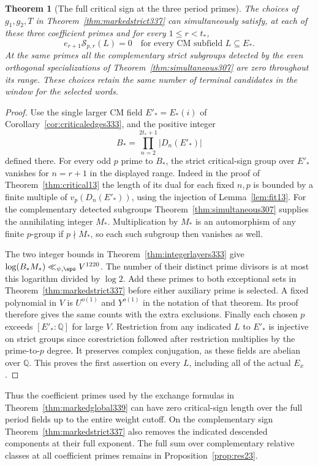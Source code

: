 \documentclass[a4paper,11pt]{article}
\newtheorem{theorem}[proposition]{Theorem}
\theoremstyle{definition}
\theoremstyle{remark}
\numberwithin{equation}{section}
\newcommand{\Sel}{\mathcal S}
\begin{document}
\begin{theorem}[The full critical sign at the three period primes]\label{thm:criticalmarks339}
The choices of \(g_1,g_2,T\) in Theorem~\ref{thm:markedstrict337}
can simultaneously satisfy, at each of these three coefficient
primes and for every \(1\le r<t_*\),
\[
                 e_{r+1}\Sel_{p,r}(L)=0
       \quad\text{for every CM subfield }L\subseteq E_* .
\]
At the same primes all the complementary strict subgroups detected
by the even orthogonal specializations of
Theorem~\ref{thm:simultaneous307} are zero throughout its range.
These choices retain the same number of terminal candidates in
the window for the selected words.
\end{theorem}
\begin{proof}
Use the single larger CM field \(E'_* = E_*(i)\) of
Corollary~\ref{cor:criticaledges333}, and the positive integer
\[
  B_*=\prod_{n=2}^{2t_*+1}|D_n(E'_*)|
\]
defined there. For every odd \(p\) prime to \(B_*\), the strict
critical-sign group over \(E'_*\) vanishes for \(n=r+1\) in the
displayed range. Indeed in the proof of Theorem~\ref{thm:critical13}
the length of its dual for each fixed \(n,p\) is bounded by
a finite multiple of \(v_p(D_n(E'_*))\), using the injection of
Lemma~\ref{lem:fit13}. For the complementary detected subgroups
Theorem~\ref{thm:simultaneous307} supplies the annihilating
integer \(M_*\). Multiplication by \(M_*\) is an automorphism of
any finite \(p\)-group if \(p\nmid M_*\), so each such subgroup
then vanishes as well.

The two integer bounds in Theorem~\ref{thm:integerlayers333}
give \(\log(B_*M_*)\ll_{\psi,\eps}V^{1220}\). The number of their
distinct prime divisors is at most this logarithm divided by
\(\log2\). Add these primes to both exceptional sets in
Theorem~\ref{thm:markedstrict337} before either auxiliary prime
is selected. A fixed polynomial in \(V\) is \(U^{o(1)}\) and
\(Y^{o(1)}\) in the notation of that theorem. Its proof therefore
gives the same counts with the extra exclusions.
Finally each chosen \(p\) exceeds \([E'_*:\mathbb Q]\) for large
\(V\). Restriction from any indicated \(L\) to \(E'_*\) is injective
on strict groups since corestriction followed after restriction
multiplies by the prime-to-\(p\) degree. It preserves complex
conjugation, as these fields are abelian over \(\mathbb Q\).
This proves the first assertion on every \(L\), including all
of the actual \(E_x\).
\end{proof}

Thus the coefficient primes used by the exchange formulas in
Theorem~\ref{thm:markedglobal339} can have zero critical-sign length
over the full period fields up to the entire weight cutoff.
On the complementary sign Theorem~\ref{thm:markedstrict337}
also removes the indicated descended components at their full
exponent. The full sum over complementary relative classes at
all coefficient primes remains in Proposition~\ref{prop:res23}.
\end{document}
